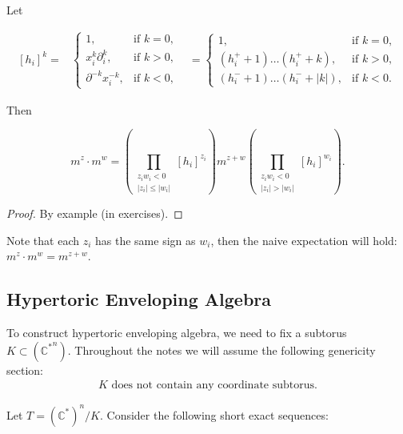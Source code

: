 \begin{proposition} Let 

\begin{equation*}
    \begin{array}{ccc}
         [h_i]^k=&\left\{
         \begin{array}{lll}
              1, & \textrm{if } k=0,\\
              x_i^k\partial_i^k, & \textrm{if } k>0,\\
              \partial^{-k}x_i^{-k}, & \textrm{if } k<0,
         \end{array}
         \right.
         &
         =\left\{
         \begin{array}{lll}
              1, & \textrm{if } k=0,\\
              (h_i^+ + 1)\dots (h_i^+ + k), & \textrm{if } k>0,\\
              (h_i^- + 1)\dots (h_i^- + |k|), & \textrm{if } k<0.
         \end{array}
         \right.
    \end{array}
\end{equation*}

Then 

$$
    m^z\cdot m^w = \left(\prod_{\substack{z_iw_i<0 \\ |z_i|\leq |w_i|}}[h_i]^{z_i}\right)m^{z+w}\left(\prod_{\substack{z_iw_i<0 \\ |z_i|> |w_i|}}[h_i]^{w_i}\right).
$$
\end{proposition}
\begin{proof}
By example (in exercises).
\end{proof}

Note that each $z_i$ has the same sign as $w_i$, then the naive expectation will hold: $m^z\cdot m^w=m^{z+w}$.

\subsection{Hypertoric Enveloping Algebra}

To construct hypertoric enveloping algebra, we need to fix a subtorus $K\subset (\mathbb{C^*}^n)$. Throughout the notes we will assume the following genericity section:
\begin{align}\tag{S}\label{subtorus_condition}
    K \textrm{ does not contain any coordinate subtorus.}
\end{align}

Let $T=(\mathbb{C^*})^n/K$. Consider the following short exact sequences:

